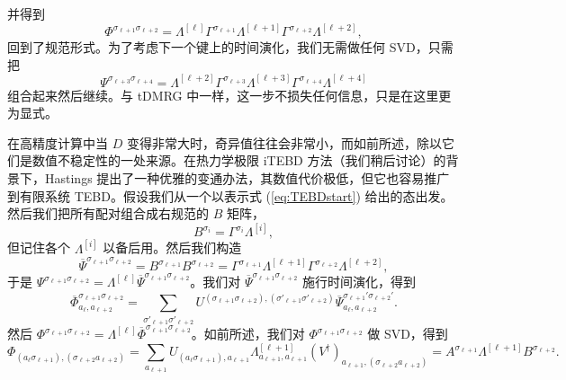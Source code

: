 并得到
\begin{equation}
\Phi^{\sigma_{\ell+1}\sigma_{\ell+2}} = \Lambda^{[\ell]}  \Gamma^{\sigma_{\ell+1}} 
 \Lambda^{[\ell+1]} \Gamma^{\sigma_{\ell+2}}  \Lambda^{[\ell+2]} ,
\end{equation}
回到了规范形式。为了考虑下一个键上的时间演化，我们无需做任何 SVD，只需把
\begin{equation}
\Psi^{\sigma_{\ell+3} \sigma_{\ell+4}} = \Lambda^{[\ell+2]}  \Gamma^{\sigma_{\ell+3}} \Lambda^{[\ell+3]}
\Gamma^{\sigma_{\ell+4}} \Lambda^{[\ell+4]}  
\end{equation}
组合起来然后继续。与 tDMRG 中一样，这一步不损失任何信息，只是在这里更为显式。

在高精度计算中当 $D$ 变得非常大时，奇异值往往会非常小，而如前所述，除以它们是数值不稳定性的一处来源。在热力学极限 iTEBD 方法（我们稍后讨论）的背景下，Hastings 提出了一种优雅的变通办法，其数值代价极低\cite{Hastings09}，但它也容易推广到有限系统 TEBD。假设我们从一个以表示式 (\ref{eq:TEBDstart}) 给出的态出发。然后我们把所有配对组合成右规范的 $B$ 矩阵，
\begin{equation}
B^{\sigma_i} = \Gamma^{\sigma_i} \Lambda^{[i]} ,
\end{equation}
但记住各个 $\Lambda^{[i]}$ 以备后用。然后我们构造
\begin{equation}
\overline{\Psi}^{\sigma_{\ell+1} \sigma_{\ell+2}} = B^{\sigma_{\ell+1}} B^{\sigma_{\ell+2}} =  \Gamma^{\sigma_{\ell+1}} \Lambda^{[\ell+1]}
\Gamma^{\sigma_{\ell+2}} \Lambda^{[\ell+2]} ,
\end{equation}
于是 $\Psi^{\sigma_{\ell+1} \sigma_{\ell+2}} = \Lambda^{[\ell]} \overline{\Psi}^{\sigma_{\ell+1} \sigma_{\ell+2}}$。我们对 $\overline{\Psi}^{\sigma_{\ell+1} \sigma_{\ell+2}}$ 施行时间演化，得到
\begin{equation}
\overline{\Phi}^{\sigma_{\ell+1}\sigma_{\ell+2}}_{a_\ell, a_{\ell+2}} = \sum_{\sigma'_{\ell+1} \sigma'_{\ell+2}}
U^{(\sigma_{\ell+1} \sigma_{\ell+2}), (\sigma'_{\ell+1} \sigma'_{\ell+2})}  \overline{\Psi}^{\sigma_{\ell+1}'\sigma_{\ell+2}'}_{a_\ell, a_{\ell+2}} .
\end{equation} 
然后 $\Phi^{\sigma_{\ell+1} \sigma_{\ell+2}} = \Lambda^{[\ell]} \overline{\Phi}^{\sigma_{\ell+1} \sigma_{\ell+2}}$。如前所述，我们对 $\Phi^{\sigma_{\ell+1} \sigma_{\ell+2}}$ 做 SVD，得到 
\begin{equation}
\Phi_{(a_\ell \sigma_{\ell+1}), (\sigma_{\ell+2} a_{\ell+2})} = \sum_{a_{\ell+1}} U_{(a_\ell \sigma_{\ell+1}),a_{\ell+1}} \Lambda^{[\ell+1]}_{a_{\ell+1},a_{\ell+1}} (V^\dagger)_{a_{\ell+1}, (\sigma_{\ell+2} a_{\ell+2})} = A^{\sigma_{\ell+1}} \Lambda^{[\ell+1]} B^{\sigma_{\ell+2}} .
\end{equation}
